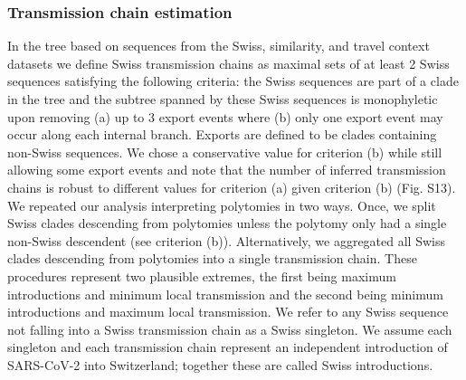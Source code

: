 \documentclass[9pt,twocolumn,twoside,lineno]{pnas-new}
\begin{document}
\subsubsection{Transmission chain estimation}
In the tree based on sequences from the Swiss, similarity, and travel context datasets we define Swiss transmission chains as maximal sets of at least 2 Swiss sequences satisfying the following criteria: the Swiss sequences are part of a clade in the tree and the subtree spanned by these Swiss sequences is monophyletic upon removing (a) up to 3 export events where (b) only one export event may occur along each internal branch. Exports are defined to be clades containing non-Swiss sequences. We chose a conservative value for criterion (b) while still allowing some export events and note that the number of inferred transmission chains is robust to different values for criterion (a) given criterion (b) (Fig. S13).
We repeated our analysis interpreting polytomies in two ways. Once, we split Swiss clades descending from polytomies unless the polytomy only had a single non-Swiss descendent (see criterion (b)). Alternatively, we aggregated all Swiss clades descending from polytomies into a single transmission chain. These procedures represent two plausible extremes, the first being maximum introductions and minimum local transmission and the second being minimum introductions and maximum local transmission.
We refer to any Swiss sequence not falling into a Swiss transmission chain as a Swiss singleton. We assume each singleton and each transmission chain represent an independent introduction of SARS-CoV-2 into Switzerland; together these are called Swiss introductions.
\end{document}
